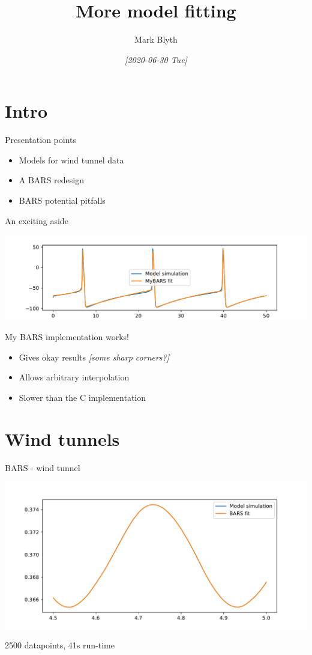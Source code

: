 \documentclass[presentation]{beamer}
\author{Mark Blyth}
\date{\textit{[2020-06-30 Tue]}}
\title{More model fitting}
\begin{document}
\maketitle

\section{Intro}
\label{sec:orgcc7a41d}
\begin{frame}[label={sec:org75258e4}]{Presentation points}
\begin{itemize}
\item Models for wind tunnel data
\item A BARS redesign
\item BARS potential pitfalls
\end{itemize}
\end{frame}

\begin{frame}[label={sec:org9d899c8}]{An exciting aside}
\begin{center}
\includegraphics[width=.9\linewidth]{./mybars.pdf}
\end{center}

My BARS implementation works! 
\begin{itemize}
\item Gives okay results \emph{[some sharp corners?]}
\item Allows arbitrary interpolation
\item Slower than the C implementation
\end{itemize}
\end{frame}

\section{Wind tunnels}
\label{sec:orgf968e6b}
\begin{frame}[label={sec:org1799d62}]{BARS - wind tunnel}
\begin{center}
\includegraphics[width=.9\linewidth]{./bars_section.pdf}
\end{center}

2500 datapoints, 41s run-time
\end{frame}
\end{document}
